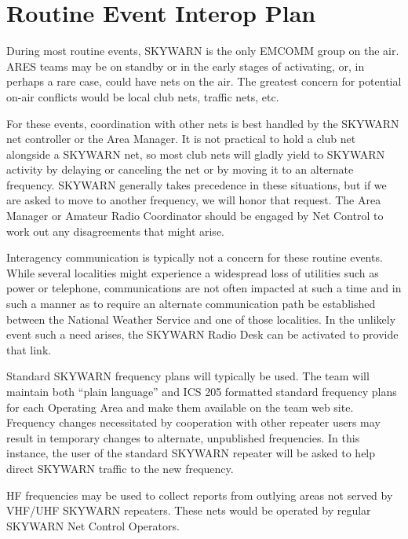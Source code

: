 \documentclass[pdflatex,letterpaper,twoside,12pt]{book}
\begin{document}

\section{Routine Event Interop Plan}

During most routine events, SKYWARN is the only EMCOMM group on the air.  ARES teams may be on standby or in the early stages of activating, or, in perhaps a rare case, could have nets on the air.  The greatest concern for potential on-air conflicts would be local club nets, traffic nets, etc.

For these events, coordination with other nets is best handled by the SKYWARN net controller or the Area Manager.  It is not practical to hold a club net alongside a SKYWARN net, so most club nets will gladly yield to SKYWARN activity by delaying or canceling the net or by moving it to an alternate frequency.  SKYWARN generally takes precedence in these situations, but if we are asked to move to another frequency, we will honor that request.  The Area Manager or Amateur Radio Coordinator should be engaged by Net Control to work out any disagreements that might arise.

Interagency communication is typically not a concern for these routine events.  While several localities might experience a widespread loss of utilities such as power or telephone, communications are not often impacted at such a time and in such a manner as to require an alternate communication path be established between the National Weather Service and one of those localities.  In the unlikely event such a need arises, the SKYWARN Radio Desk can be activated to provide that link.

Standard SKYWARN frequency plans will typically be used.  The team will maintain both ``plain language'' and ICS 205 formatted standard frequency plans for each Operating Area and make them available on the team web site.  Frequency changes necessitated by cooperation with other repeater users may result in temporary changes to alternate, unpublished frequencies.  In this instance, the user of the standard SKYWARN repeater will be asked to help direct SKYWARN traffic to the new frequency.

HF frequencies may be used to collect reports from outlying areas not served by VHF/UHF SKYWARN repeaters.  These nets would be operated by regular SKYWARN Net Control Operators.

\end{document}
